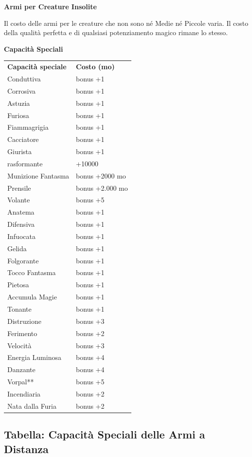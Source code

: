 \documentclass[a4paper,11pt,twoside,openany]{book}
\begin{document}
{\textbf{Armi per Creature Insolite}

Il costo delle armi per le creature che non sono né Medie né Piccole varia. Il costo della qualità perfetta e di qualsiasi potenziamento
magico rimane lo stesso.

\bigskip

\textbf{Capacità Speciali}

\bigskip

\begin{tabular}{ll}
\toprule
\textbf{Capacità speciale} & \textbf{Costo (mo)}\tabularnewline
Conduttiva \index{Conduttiva} & bonus +1\tabularnewline
Corrosiva\index{Corrosiva} & bonus +1\tabularnewline
Astuzia \index{Astuzia}& bonus +1\tabularnewline
Furiosa \index{Furiosa} & bonus +1\tabularnewline
Fiammagrigia \index{Fiammagrigia}& bonus +1\tabularnewline
Cacciatore \index{Cacciatore} & bonus +1\tabularnewline
Giurista \index{Giurista} & bonus +1\tabularnewline
rasformante \index{Trasformante} & +10000\tabularnewline
Munizione Fantasma \index{Munizione Fantasma} & bonus +2000 mo\tabularnewline
Prensile \index{Prensile}& bonus +2.000 mo\tabularnewline
Volante \index{Volante}& bonus +5\tabularnewline
Anatema\index{Anatema} & bonus +1\tabularnewline
Difensiva\index{Difensiva} & bonus +1\tabularnewline
Infuocata \index{Infuocata}& bonus +1\tabularnewline
Gelida \index{Gelida} & bonus +1\tabularnewline
Folgorante \index{Folgorante} & bonus +1\tabularnewline
Tocco Fantasma \index{Tocco Fantasma} & bonus +1\tabularnewline
Pietosa \index{Pietosa} & bonus +1\tabularnewline
Accumula Magie \index{Accumula Magie} & bonus +1\tabularnewline
Tonante \index{Tonante} & bonus +1\tabularnewline
Distruzione \index{Distruzione}& bonus +3\tabularnewline
Ferimento \index{Ferimento} & bonus +2\tabularnewline
Velocità \index{Velocita'} & bonus +3\tabularnewline
Energia Luminosa \index{Energia Luminosa}& bonus +4\tabularnewline
Danzante \index{Danzante} & bonus +4\tabularnewline
Vorpal** \index{Vorpal} & bonus +5\tabularnewline
Incendiaria \index{Incendiaria} & bonus +2\tabularnewline
Nata dalla Furia \index{Nata dalla Furia} & bonus +2\tabularnewline
\end{tabular}

\subsection{Tabella: Capacità Speciali delle Armi a Distanza}

\label{tabella-capacita-speciali-delle-armi-a-distanza}

}
\end{document}
